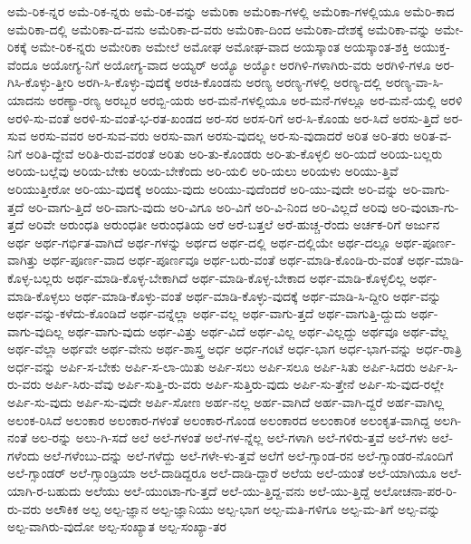 {ಅಮೆ-ರಿಕ-ನ್ನರ
ಅಮೆ-ರಿಕ-ನ್ನರು
ಅಮೆ-ರಿಕ-ವನ್ನು
ಅಮೆರಿಕಾ
ಅಮೆರಿಕಾ-ಗಳಲ್ಲಿ
ಅಮೆರಿಕಾ-ಗಳಲ್ಲಿಯೂ
ಅಮೆರಿ-ಕಾದ
ಅಮೆರಿಕಾ-ದಲ್ಲಿ
ಅಮೆರಿಕಾ-ದ-ವನು
ಅಮೆರಿಕಾ-ದ-ವರು
ಅಮೆರಿಕಾ-ದಿಂದ
ಅಮೆರಿಕಾ-ದೇಶಕ್ಕೆ
ಅಮೆರಿಕಾ-ವನ್ನು
ಅಮೇ-ರಿಕಕ್ಕೆ
ಅಮೇ-ರಿಕ-ನ್ನರು
ಅಮೇರಿಕಾ
ಅಮೇಲೆ
ಅಮೋಘ
ಅಮೋಘ-ವಾದ
ಅಯಸ್ಕಾಂತ
ಅಯಸ್ಕಾಂತ-ಶಕ್ತಿ
ಅಯುಕ್ತ-ವೆಂದೂ
ಅಯೋಗ್ಯ-ನಿಗೆ
ಅಯೋಗ್ಯ-ವಾದ
ಅಯ್ಯರ್
ಅಯ್ಯೊ
ಅಯ್ಯೋ
ಅರಗಿಳಿ-ಗಳಾಗಿರು-ವರು
ಅರಗಿಳಿ-ಗಳೂ
ಅರ-ಗಿಸಿ-ಕೊಳ್ಳು-ತ್ತೀರಿ
ಅರಗಿ-ಸಿ-ಕೊಳ್ಳು-ವುದಕ್ಕೆ
ಅರಚಿ-ಕೊಂಡನು
ಅರಣ್ಯ
ಅರಣ್ಯ-ಗಳಲ್ಲಿ
ಅರಣ್ಯ-ದಲ್ಲಿ
ಅರಣ್ಯ-ವಾ-ಸಿ-ಯಾದನು
ಅರಣ್ಯಾ-ರಣ್ಯ
ಅರಬ್ಬರ
ಅರಬ್ಬಿ-ಯರು
ಅರ-ಮನೆ-ಗಳಲ್ಲಿಯೂ
ಅರ-ಮನೆ-ಗಳಲ್ಲೂ
ಅರ-ಮನೆ-ಯಲ್ಲಿ
ಅರಳಿ
ಅರಳಿ-ಸು-ವಂತೆ
ಅರಳಿ-ಸು-ವಂತೆ-ಭ-ರತ-ಖಂಡದ
ಅರ-ಸರ
ಅರಸ-ರಿಗೆ
ಅರ-ಸಿ-ಕೊಂಡು
ಅರ-ಸಿದೆ
ಅರಸು-ತ್ತಿದೆ
ಅರ-ಸುವ
ಅರಸು-ವವರ
ಅರ-ಸುವ-ವರು
ಅರಸು-ವಾಗ
ಅರಸು-ವುದಲ್ಲ
ಅರ-ಸು-ವುದಾದರೆ
ಅರಿತ
ಅರಿ-ತರು
ಅರಿತ-ವ-ನಿಗೆ
ಅರಿತಿ-ದ್ದೇವೆ
ಅರಿತಿ-ರುವ-ವರಂತೆ
ಅರಿತು
ಅರಿ-ತು-ಕೊಂಡರು
ಅರಿ-ತು-ಕೊಳ್ಳಲಿ
ಅರಿ-ಯದೆ
ಅರಿಯ-ಬಲ್ಲರು
ಅರಿಯ-ಬಲ್ಲೆವು
ಅರಿಯ-ಬೇಕು
ಅರಿಯ-ಬೇಕೆಂದು
ಅರಿ-ಯಲಿ
ಅರಿ-ಯಲು
ಅರಿಯಳು
ಅರಿಯು-ತ್ತಿವೆ
ಅರಿಯುತ್ತೀರೋ
ಅರಿ-ಯು-ವುದಕ್ಕೆ
ಅರಿಯು-ವುದು
ಅರಿಯು-ವುದೆಂದರೆ
ಅರಿ-ಯು-ವುದೇ
ಅರಿ-ವನ್ನು
ಅರಿ-ವಾಗು-ತ್ತದೆ
ಅರಿ-ವಾಗು-ತ್ತಿದೆ
ಅರಿ-ವಾಗು-ವುದು
ಅರಿ-ವಿಗೂ
ಅರಿ-ವಿಗೆ
ಅರಿ-ವಿ-ನಿಂದ
ಅರಿ-ವಿಲ್ಲದೆ
ಅರಿವು
ಅರಿ-ವುಂಟಾ-ಗು-ತ್ತದೆ
ಅರಿವೇ
ಅರುಂಧತಿ
ಅರುಂಧತೀ
ಅರುಂಧತಿಯ
ಅರೆ
ಅರೆ-ಬತ್ತಲೆ
ಅರೆ-ಹುಚ್ಚ-ರೆಂದು
ಅರ್ಚಕ-ರಿಗೆ
ಅರ್ಜುನ
ಅರ್ಥ
ಅರ್ಥ-ಗರ್ಭಿತ-ವಾಗಿದೆ
ಅರ್ಥ-ಗಳನ್ನು
ಅರ್ಥದ
ಅರ್ಥ-ದಲ್ಲಿ
ಅರ್ಥ-ದಲ್ಲಿಯೇ
ಅರ್ಥ-ದಲ್ಲೂ
ಅರ್ಥ-ಪೂರ್ಣ-ವಾಗಿತ್ತು
ಅರ್ಥ-ಪೂರ್ಣ-ವಾದ
ಅರ್ಥ-ಪೂರ್ಣವೂ
ಅರ್ಥ-ಬರು-ವಂತೆ
ಅರ್ಥ-ಮಾಡಿ-ಕೊಂಡಿ-ರು-ವಂತೆ
ಅರ್ಥ-ಮಾಡಿ-ಕೊಳ್ಳ-ಬಲ್ಲರು
ಅರ್ಥ-ಮಾಡಿ-ಕೊಳ್ಳ-ಬೇಕಾಗಿದೆ
ಅರ್ಥ-ಮಾಡಿ-ಕೊಳ್ಳ-ಬೇಕಾದ
ಅರ್ಥ-ಮಾಡಿ-ಕೊಳ್ಳಲಿಲ್ಲ
ಅರ್ಥ-ಮಾಡಿ-ಕೊಳ್ಳಲು
ಅರ್ಥ-ಮಾಡಿ-ಕೊಳ್ಳು-ವಂತೆ
ಅರ್ಥ-ಮಾಡಿ-ಕೊಳ್ಳು-ವುದಕ್ಕೆ
ಅರ್ಥ-ಮಾಡಿ-ಸಿ-ದ್ದೀರಿ
ಅರ್ಥ-ವನ್ನು
ಅರ್ಥ-ವನ್ನು-ಕಳೆದು-ಕೊಂಡಿದೆ
ಅರ್ಥ-ವನ್ನೆಲ್ಲಾ
ಅರ್ಥ-ವಲ್ಲ
ಅರ್ಥ-ವಾಗು-ತ್ತದೆ
ಅರ್ಥ-ವಾಗುತ್ತಿ-ದ್ದುದು
ಅರ್ಥ-ವಾಗು-ವುದಿಲ್ಲ
ಅರ್ಥ-ವಾಗು-ವುದು
ಅರ್ಥ-ವಿತ್ತು
ಅರ್ಥ-ವಿದೆ
ಅರ್ಥ-ವಿಲ್ಲ
ಅರ್ಥ-ವಿಲ್ಲದ್ದು
ಅರ್ಥವೂ
ಅರ್ಥ-ವೆಲ್ಲ
ಅರ್ಥ-ವೆಲ್ಲಾ
ಅರ್ಥವೇ
ಅರ್ಥ-ವೇನು
ಅರ್ಥ-ಶಾಸ್ತ್ರ
ಅರ್ಧ
ಅರ್ಧ-ಗಂಟೆ
ಅರ್ಧ-ಭಾಗ
ಅರ್ಧ-ಭಾಗ-ವನ್ನು
ಅರ್ಧ-ರಾತ್ರಿ
ಅರ್ಧ-ವನ್ನು
ಅರ್ಪಿ-ಸ-ಬೇಕು
ಅರ್ಪಿ-ಸ-ಲಾ-ಯಿತು
ಅರ್ಪಿ-ಸಲು
ಅರ್ಪಿ-ಸಲೂ
ಅರ್ಪಿ-ಸಿತು
ಅರ್ಪಿ-ಸಿದರು
ಅರ್ಪಿ-ಸಿ-ರು-ವರು
ಅರ್ಪಿ-ಸಿರು-ವೆವು
ಅರ್ಪಿ-ಸುತ್ತಿ-ರು-ವರು
ಅರ್ಪಿ-ಸುತ್ತಿರು-ವುದು
ಅರ್ಪಿ-ಸು-ತ್ತೇನೆ
ಅರ್ಪಿ-ಸು-ವುದ-ರಲ್ಲೇ
ಅರ್ಪಿ-ಸು-ವುದು
ಅರ್ಪಿ-ಸು-ವುದೇ
ಅರ್ಪಿ-ಸೋಣ
ಅರ್ಹ-ನಲ್ಲ
ಅರ್ಹ-ವಾಗಿದೆ
ಅರ್ಹ-ವಾಗಿ-ದ್ದರೆ
ಅರ್ಹ-ವಾಗಿಲ್ಲ
ಅಲಂಕ-ರಿಸಿದೆ
ಅಲಂಕಾರ
ಅಲಂಕಾರ-ಗಳಂತೆ
ಅಲಂಕಾರ-ಗೊಂಡ
ಅಲಂಕಾರದ
ಅಲಂಕಾರಿಕ
ಅಲಂಕೃತ-ವಾಗಿದ್ದ
ಅಲಗಿ-ನಂತೆ
ಅಲ-ರನ್ನು
ಅಲು-ಗಿ-ಸದೆ
ಅಲೆ
ಅಲೆ-ಗಳಂತೆ
ಅಲೆ-ಗಳ-ನ್ನೆಲ್ಲ
ಅಲೆ-ಗಳಾಗಿ
ಅಲೆ-ಗಳಿರು-ತ್ತವೆ
ಅಲೆ-ಗಳು
ಅಲೆ-ಗಳೆಂದು
ಅಲೆ-ಗಳೆಂಬು-ದನ್ನು
ಅಲೆ-ಗಳೆದ್ದು
ಅಲೆ-ಗಳೇ-ಳು-ತ್ತವೆ
ಅಲೆಗೆ
ಅಲೆ-ಗ್ಸಾಂಡ-ರನ
ಅಲೆ-ಗ್ಸಾಂಡರ-ನೊಂದಿಗೆ
ಅಲೆ-ಗ್ಸಾಂಡರ್
ಅಲೆ-ಗ್ಸಾಂಡ್ರಿಯಾ
ಅಲೆ-ದಾಡಿದ್ದರೂ
ಅಲೆ-ದಾಡಿ-ದ್ದಾರೆ
ಅಲೆಯ
ಅಲೆ-ಯಂತೆ
ಅಲೆ-ಯಾಗಿಯೂ
ಅಲೆ-ಯಾಗಿ-ರ-ಬಹುದು
ಅಲೆಯು
ಅಲೆ-ಯುಂಟಾ-ಗು-ತ್ತದೆ
ಅಲೆ-ಯು-ತ್ತಿದ್ದ-ವನು
ಅಲೆ-ಯು-ತ್ತಿದ್ದೆ
ಅಲೋಚನಾ-ಪರ-ರಿ-ರು-ವರು
ಅಲೌಕಿಕ
ಅಲ್ಪ
ಅಲ್ಪ-ಜ್ಞಾನ
ಅಲ್ಪ-ಜ್ಞಾನಿಯು
ಅಲ್ಪ-ಭಾಗ
ಅಲ್ಪ-ಮತಿ-ಗಳಿಗೂ
ಅಲ್ಪ-ಮ-ತಿಗೆ
ಅಲ್ಪ-ವನ್ನು
ಅಲ್ಪ-ವಾಗಿರು-ವುದೋ
ಅಲ್ಪ-ಸಂಖ್ಯಾತ
ಅಲ್ಪ-ಸಂಖ್ಯಾ-ತರ
}
